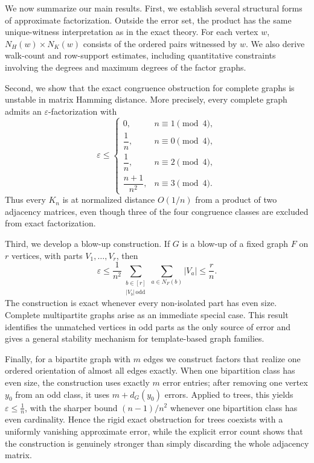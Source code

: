 \documentclass{file}
\newcommand{\eps}{\varepsilon}
\begin{document}
We now summarize our main results. First, we establish several structural
forms of approximate factorization.  Outside the error set, the product has
the same unique-witness interpretation as in the exact theory.  For each
vertex $w$, $N_H(w)\times N_K(w)$ consists of the ordered pairs witnessed by $w$. We also derive walk-count and
row-support estimates, including quantitative constraints involving the
degrees and maximum degrees of the factor graphs.

Second, we show that the exact congruence obstruction for complete graphs is
unstable in matrix Hamming distance.  More precisely, every complete graph
admits an $\eps$-factorization with
\[
\eps\leq
\begin{cases}
0, & n\equiv1\pmod4,\\[1mm]
\dfrac1n, & n\equiv0\pmod4,\\[2mm]
\dfrac1n, & n\equiv2\pmod4,\\[2mm]
\dfrac{n+1}{n^2}, & n\equiv3\pmod4.
\end{cases}
\]
Thus every $K_n$ is at normalized distance $O(1/n)$ from a product of two
adjacency matrices, even though three of the four congruence classes are
excluded from exact factorization.

Third, we develop a blow-up construction.  If $G$ is a blow-up of a fixed
graph $F$ on $r$ vertices, with parts $V_1,\dots,V_r$, then
\[
  \eps
  \leq
  \frac{1}{n^2}
  \sum_{\substack{b\in[r]\\ |V_b|\,\mathrm{odd}}}
  \sum_{a\in N_F(b)} |V_a|
  \leq \frac{r}{n}.
\]
The construction is exact whenever every non-isolated part has even size.
Complete multipartite graphs arise as an immediate special case.  This
result identifies the unmatched vertices in odd parts as the only source of
error and gives a general stability mechanism for template-based graph
families.

Finally, for a bipartite graph with $m$ edges we construct factors that
realize one ordered orientation of almost all edges exactly.  
When one bipartition class has even size, the construction uses exactly $m$ error
entries; after removing one vertex $y_0$ from an odd class, it uses
$m+d_G(y_0)$ errors.  
Applied to trees, this yields $\eps\leq \frac1n$, with the sharper bound $(n-1)/n^2$ whenever one bipartition class has even cardinality.  
Hence the rigid exact obstruction for trees coexists with a uniformly vanishing approximate error, while the explicit error count shows that the construction is genuinely stronger than simply discarding the whole adjacency matrix.
\end{document}
